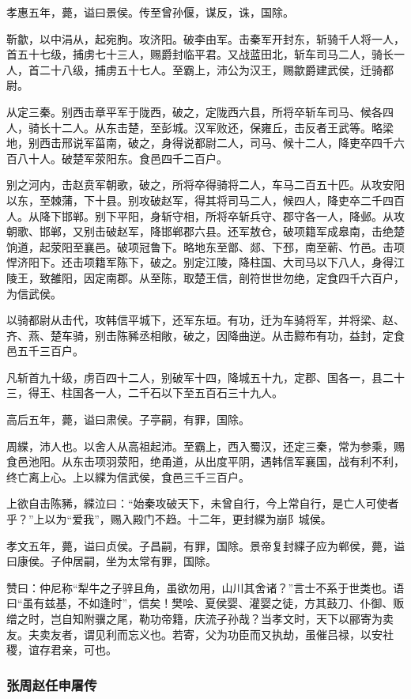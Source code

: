 \documentclass[]{article}
\begin{document}
孝惠五年，薨，谥曰景侯。传至曾孙偃，谋反，诛，国除。

靳歙，以中涓从，起宛朐。攻济阳。破李由军。击秦军开封东，斩骑千人将一人，首五十七级，捕虏七十三人，赐爵封临平君。又战蓝田北，斩车司马二人，骑长一人，首二十八级，捕虏五十七人。至霸上，沛公为汉王，赐歙爵建武侯，迁骑都尉。

从定三秦。别西击章平军于陇西，破之，定陇西六县，所将卒斩车司马、候各四人，骑长十二人。从东击楚，至彭城。汉军败还，保雍丘，击反者王武等。略梁地，别西击邢说军菑南，破之，身得说都尉二人，司马、候十二人，降吏卒四千六百八十人。破楚军荥阳东。食邑四千二百户。

别之河内，击赵贲军朝歌，破之，所将卒得骑将二人，车马二百五十匹。从攻安阳以东，至棘蒲，下十县。别攻破赵军，得其将司马二人，候四人，降吏卒二千四百人。从降下邯郸。别下平阳，身斩守相，所将卒斩兵守、郡守各一人，降邺。从攻朝歌、邯郸，又别击破赵军，降邯郸郡六县。还军敖仓，破项籍军成皋南，击绝楚饷道，起荥阳至襄邑。破项冠鲁下。略地东至鄫、郯、下邳，南至蕲、竹邑。击项悍济阳下。还击项籍军陈下，破之。别定江陵，降柱国、大司马以下八人，身得江陵王，致雒阳，因定南郡。从至陈，取楚王信，剖符世世勿绝，定食四千六百户，为信武侯。

以骑都尉从击代，攻韩信平城下，还军东垣。有功，迁为车骑将军，并将梁、赵、齐、燕、楚车骑，别击陈豨丞相敞，破之，因降曲逆。从击黥布有功，益封，定食邑五千三百户。

凡斩首九十级，虏百四十二人，别破军十四，降城五十九，定郡、国各一，县二十三，得王、柱国各一人，二千石以下至五百石三十九人。

高后五年，薨，谥曰肃侯。子亭嗣，有罪，国除。

周緤，沛人也。以舍人从高祖起沛。至霸上，西入蜀汉，还定三秦，常为参乘，赐食邑池阳。从东击项羽荥阳，绝甬道，从出度平阴，遇韩信军襄国，战有利不利，终亡离上心。上以緤为信武侯，食邑三千三百户。

上欲自击陈豨，緤泣曰：``始秦攻破天下，未曾自行，今上常自行，是亡人可使者乎？''上以为``爱我''，赐入殿门不趋。十二年，更封緤为崩阝城侯。

孝文五年，薨，谥曰贞侯。子昌嗣，有罪，国除。景帝复封緤子应为郸侯，薨，谥曰康侯。子仲居嗣，坐为太常有罪，国除。

赞曰：仲尼称``犁牛之子骍且角，虽欲勿用，山川其舍诸？''言士不系于世类也。语曰``虽有兹基，不如逢时''，信矣！樊哙、夏侯婴、灌婴之徒，方其鼓刀、仆御、贩缯之时，岂自知附骥之尾，勒功帝籍，庆流子孙哉？当孝文时，天下以郦寄为卖友。夫卖友者，谓见利而忘义也。若寄，父为功臣而又执劫，虽催吕禄，以安社稷，谊存君亲，可也。

\hypertarget{header-n3890}{%
\subsubsection{张周赵任申屠传}\label{header-n3890}}
\end{document}
